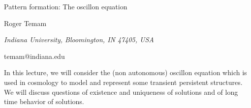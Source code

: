\documentclass[10pt,a4paper]{article}
\begin{document}
\begin{center}

{\Large Pattern formation: The oscillon equation}

\bigskip

{\sc Roger Temam}

{\small\it Indiana University, Bloomington, IN 47405, USA}

{\small\rm temam@indiana.edu}

\end{center}

\bigskip



In this lecture, we will consider the (non autonomous) oscillon
equation which is used in cosmology to model and  represent some transient
persistent structures. We will discuss questions of existence and uniqueness
of solutions and of long time behavior of solutions.
\end{document}
